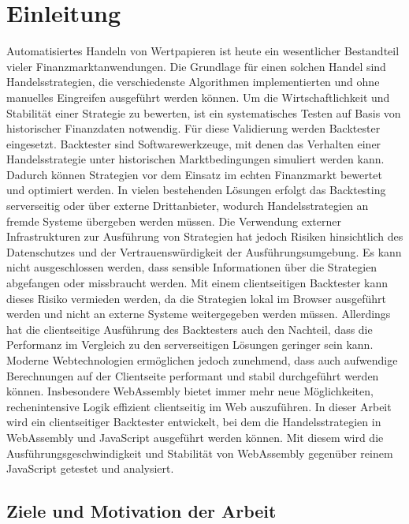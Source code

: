 \chapter{Einleitung}
\label{cha:Einleitung}

Automatisiertes Handeln von Wertpapieren ist heute ein wesentlicher Bestandteil vieler Finanzmarktanwendungen.
\cite{HOROBET2024123746}
Die Grundlage für einen solchen Handel sind Handelsstrategien, die verschiedenste Algorithmen implementierten und ohne manuelles Eingreifen ausgeführt werden können.
Um die Wirtschaftlichkeit und Stabilität einer Strategie zu bewerten, ist ein systematisches Testen auf Basis von historischer Finanzdaten notwendig.
Für diese Validierung werden Backtester eingesetzt.
\newline
Backtester sind Softwarewerkzeuge, mit denen das Verhalten einer Handelsstrategie unter historischen Marktbedingungen simuliert werden kann.
Dadurch können Strategien vor dem Einsatz im echten Finanzmarkt bewertet und optimiert werden.
In vielen bestehenden Lösungen erfolgt das Backtesting serverseitig oder über externe Drittanbieter, wodurch Handelsstrategien an fremde Systeme übergeben werden müssen.
Die Verwendung externer Infrastrukturen zur Ausführung von Strategien hat jedoch Risiken hinsichtlich des Datenschutzes und der Vertrauenswürdigkeit der Ausführungsumgebung.
Es kann nicht ausgeschlossen werden, dass sensible Informationen über die Strategien abgefangen oder missbraucht werden.
Mit einem clientseitigen Backtester kann dieses Risiko vermieden werden, da die Strategien lokal im Browser ausgeführt werden und nicht an externe Systeme weitergegeben werden müssen.
Allerdings hat die clientseitige Ausführung des Backtesters auch den Nachteil, dass die Performanz im Vergleich zu den serverseitigen Lösungen geringer sein kann.
Moderne Webtechnologien ermöglichen jedoch zunehmend, dass auch aufwendige Berechnungen auf der Clientseite performant und stabil durchgeführt werden können.
Insbesondere WebAssembly bietet immer mehr neue Möglichkeiten, rechenintensive Logik effizient clientseitig im Web auszuführen.
\newline
In dieser Arbeit wird ein clientseitiger Backtester entwickelt, bei dem die Handelsstrategien in WebAssembly und JavaScript ausgeführt werden können.
Mit diesem wird die Ausführungsgeschwindigkeit und Stabilität von WebAssembly gegenüber reinem JavaScript getestet und analysiert.

\newpage

\section{Ziele und Motivation der Arbeit}
\label{sec:ZieleundMotivationderArbeit}


